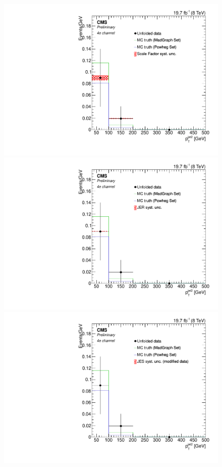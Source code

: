 \begin{figure}[hbtp]
\begin{center}
   \includegraphics[width=0.8\cmsFigWidth]{Figures/Unfolding/Systematics/ZZTo4e_PtJet2_SFSq_Mad_fr}
   \includegraphics[width=0.8\cmsFigWidth]{Figures/Unfolding/Systematics/ZZTo4e_PtJet2_JER_Mad_fr}
   \includegraphics[width=0.8\cmsFigWidth]{Figures/Unfolding/Systematics/ZZTo4e_PtJet2_JES_ModData_Mad_fr}     

\end{center}
\end{figure}
